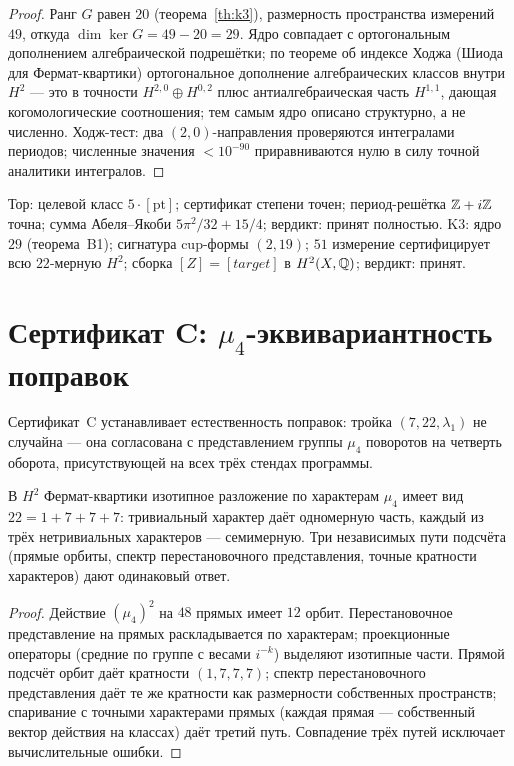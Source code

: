 \begin{proof}
Ранг $G$ равен $20$ (теорема~\ref{th:k3}), размерность пространства
измерений $49$, откуда $\dim\ker G=49-20=29$. Ядро совпадает с
ортогональным дополнением алгебраической подрешётки; по теореме об
индексе Ходжа (Шиода для Фермат-квартики) ортогональное дополнение
алгебраических классов внутри $H^2$ — это в точности
$H^{2,0}\oplus H^{0,2}$ плюс антиалгебраическая часть $H^{1,1}$,
дающая когомологические соотношения; тем самым ядро описано
структурно, а не численно. Ходж-тест: два $(2,0)$-направления
проверяются интегралами периодов; численные значения $<10^{-90}$
приравниваются нулю в силу точной аналитики интегралов.
\end{proof}

\begin{databox}
Тор: целевой класс $5\cdot[\mathrm{pt}]$; сертификат степени точен;
период-решётка $\mathbb{Z}+i\mathbb{Z}$ точна; сумма Абеля--Якоби
$5\pi^2/32+15/4$; вердикт: принят полностью. K3: ядро $29$
(теорема~B1); сигнатура cup-формы $(2,19)$; $51$ измерение
сертифицирует всю $22$-мерную $H^2$; сборка $[Z]=[target]$ в
$H^2(X,\mathbb{Q})$; вердикт: принят.
\end{databox}

\section{Сертификат C: $\mu_4$-эквивариантность поправок}\label{sec:certC}

Сертификат~C устанавливает естественность поправок: тройка $(7,22,
\lambda_1)$ не случайна — она согласована с представлением группы
$\mu_4$ поворотов на четверть оборота, присутствующей на всех трёх
стендах программы.

\begin{theorem}[C1 — изотипика K3]\label{th:C1}
В $H^2$ Фермат-квартики изотипное разложение по характерам $\mu_4$
имеет вид $22=1+7+7+7$: тривиальный характер даёт одномерную часть,
каждый из трёх нетривиальных характеров — семимерную. Три
независимых пути подсчёта (прямые орбиты, спектр перестановочного
представления, точные кратности характеров) дают одинаковый ответ.
\end{theorem}

\begin{proof}
Действие $(\mu_4)^2$ на $48$ прямых имеет $12$ орбит. Перестановочное
представление на прямых раскладывается по характерам; проекционные
операторы (средние по группе с весами $i^{-k}$) выделяют изотипные
части. Прямой подсчёт орбит даёт кратности $(1,7,7,7)$; спектр
перестановочного представления даёт те же кратности как размерности
собственных пространств; спаривание с точными характерами прямых
(каждая прямая — собственный вектор действия на классах) даёт
третий путь. Совпадение трёх путей исключает вычислительные ошибки.
\end{proof}


